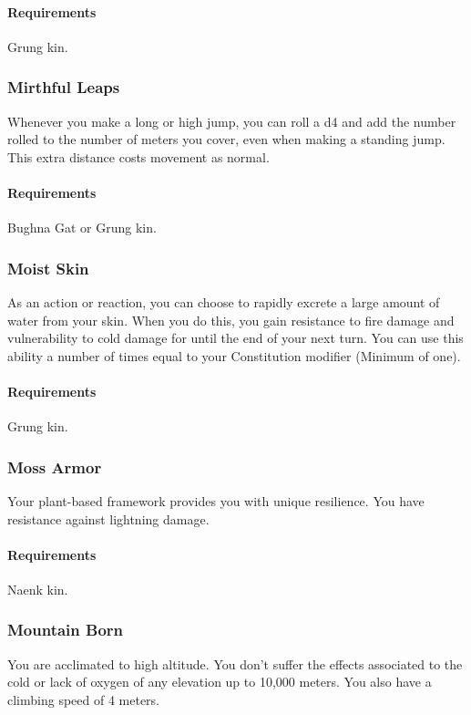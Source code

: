     \paragraph{Requirements} Grung kin.
\subsubsection{Mirthful Leaps} \label{feat::mirthfulleaps}
    Whenever you make a long or high jump, you can roll a d4 and add the number rolled to the number of meters you cover, even when making a standing jump.
    This extra distance costs movement as normal.
    \paragraph{Requirements} Bughna Gat or Grung kin.
\subsubsection{Moist Skin} \label{feat::moistskin}
    As an action or reaction, you can choose to rapidly excrete a large amount of water from your skin.
    When you do this, you gain resistance to fire damage and vulnerability to cold damage for until the end of your next turn.
    You can use this ability a number of times equal to your Constitution modifier (Minimum of one).
    \paragraph{Requirements} Grung kin.
\subsubsection{Moss Armor} \label{feat::mossarmor}
    Your plant-based framework provides you with unique resilience.
    You have resistance against lightning damage.
    \paragraph{Requirements} Naenk kin.
\subsubsection{Mountain Born} \label{feat::mountainborn}
    You are acclimated to high altitude.
    You don't suffer the effects associated to the cold or lack of oxygen of any elevation up to 10,000 meters.
    You also have a climbing speed of 4 meters.
